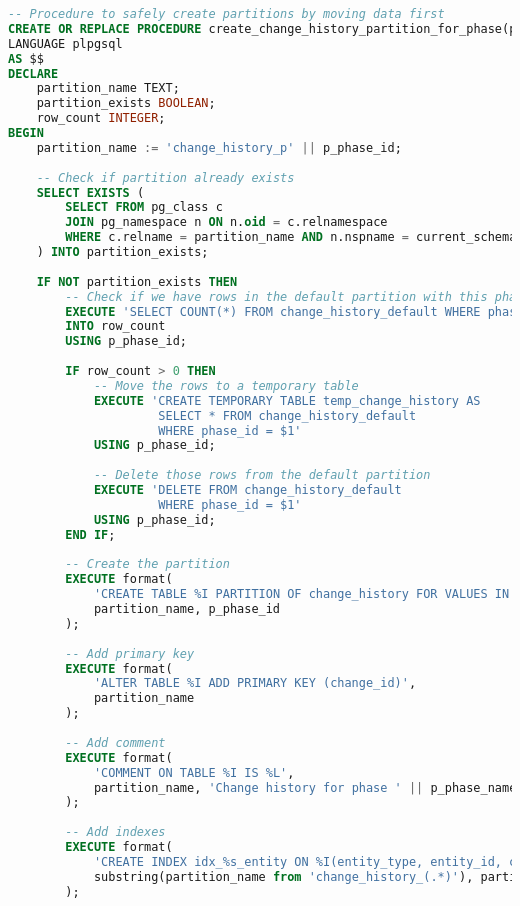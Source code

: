 \begin{lstlisting}[language=SQL, caption={Automatic Partition Creation}, label={lst:auto-partition-creation}]
-- Procedure to safely create partitions by moving data first
CREATE OR REPLACE PROCEDURE create_change_history_partition_for_phase(p_phase_id INTEGER, p_phase_name VARCHAR)
LANGUAGE plpgsql
AS $$
DECLARE
    partition_name TEXT;
    partition_exists BOOLEAN;
    row_count INTEGER;
BEGIN
    partition_name := 'change_history_p' || p_phase_id;
    
    -- Check if partition already exists
    SELECT EXISTS (
        SELECT FROM pg_class c
        JOIN pg_namespace n ON n.oid = c.relnamespace
        WHERE c.relname = partition_name AND n.nspname = current_schema()
    ) INTO partition_exists;
    
    IF NOT partition_exists THEN
        -- Check if we have rows in the default partition with this phase_id
        EXECUTE 'SELECT COUNT(*) FROM change_history_default WHERE phase_id = $1'
        INTO row_count
        USING p_phase_id;
        
        IF row_count > 0 THEN
            -- Move the rows to a temporary table
            EXECUTE 'CREATE TEMPORARY TABLE temp_change_history AS 
                     SELECT * FROM change_history_default 
                     WHERE phase_id = $1'
            USING p_phase_id;
            
            -- Delete those rows from the default partition
            EXECUTE 'DELETE FROM change_history_default 
                     WHERE phase_id = $1'
            USING p_phase_id;
        END IF;
        
        -- Create the partition
        EXECUTE format(
            'CREATE TABLE %I PARTITION OF change_history FOR VALUES IN (%L)',
            partition_name, p_phase_id
        );
        
        -- Add primary key
        EXECUTE format(
            'ALTER TABLE %I ADD PRIMARY KEY (change_id)',
            partition_name
        );
        
        -- Add comment
        EXECUTE format(
            'COMMENT ON TABLE %I IS %L',
            partition_name, 'Change history for phase ' || p_phase_name
        );
        
        -- Add indexes
        EXECUTE format(
            'CREATE INDEX idx_%s_entity ON %I(entity_type, entity_id, changed_at)',
            substring(partition_name from 'change_history_(.*)'), partition_name
        );
        

\end{lstlisting}
